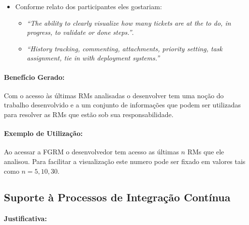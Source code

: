 \begin{itemize}
	\item Conforme relato dos participantes eles gostariam:
	\begin{itemize}
		\item \textit{``The ability to clearly visualize how many tickets are at
				the to do, in progress, to validate or done steps.''}.
		\item \textit{``History tracking, commenting, attachments, priority
				setting, task assignment, tie in with deployment systems.''}
	\end{itemize}
\end{itemize}

\paragraph{Benefício Gerado:}
\label{par:papéis_afetados_s04}

Com o acesso às últimas RMs analisadas o desenvolver tem uma noção do trabalho
desenvolvido e a um conjunto de informações que podem ser utilizadas para
resolver as RMs que estão sob sua responsabilidade.

\paragraph{Exemplo de Utilização:}
\label{par:exemplo_de_utilização_s04}

Ao acessar a FGRM o desenvolvedor tem acesso as últimas $n$ RMs que ele
analisou. Para facilitar a visualização este numero pode ser fixado em valores
tais como $n = {5, 10, 30}$.

\subsection{Suporte à Processos de Integração Contínua}
\label{sub:suporte_integracao_continua}


\paragraph{Justificativa:}
\label{par:justificativa_s05}

